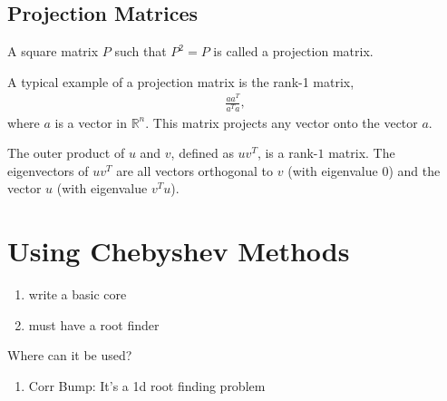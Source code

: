 \documentclass{amsart}
\theoremstyle{plain}
\numberwithin{equation}{section}
\begin{document}
\subsection*{Projection Matrices}
A square matrix $P$ such that $P^2=P$ is called
a projection matrix. 

A typical example of a projection matrix is the 
rank-1 matrix,
\begin{align*}
\frac{aa^T}{a^Ta},
\end{align*}
where $a$ is a vector in $\mathbb{R}^n$. This matrix projects
any vector onto the vector $a$. 

The outer product of $u$ and $v$, defined as $uv^T$, is a rank-$1$  matrix.
The eigenvectors of $uv^T$ are 
all vectors orthogonal to $v$ (with eigenvalue $0$) and the 
vector $u$ (with eigenvalue $v^Tu$).



\section{Using Chebyshev Methods}
\begin{enumerate}
\item write a basic core
\item must have a root finder
\end{enumerate}

Where can it be used?
\begin{enumerate}
\item Corr Bump: It's a 1d root finding problem
\end{enumerate}
\end{document}
